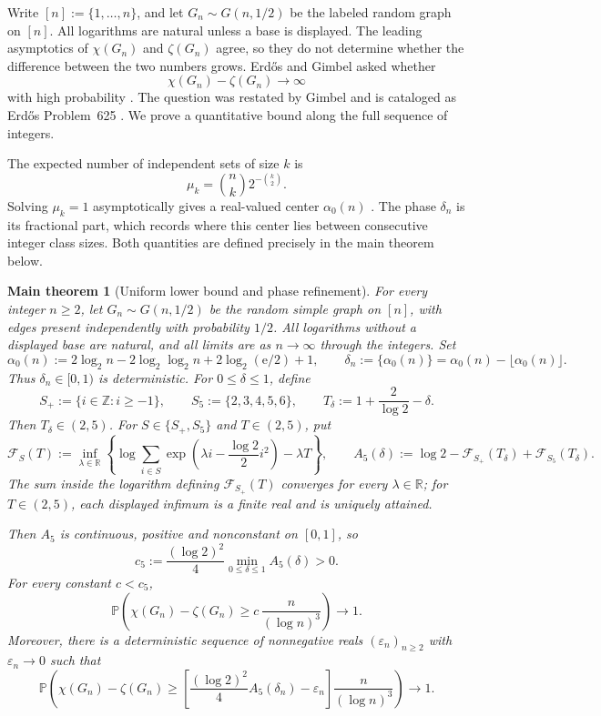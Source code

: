 \documentclass[a4paper,10pt,reqno]{amsart}
\numberwithin{equation}{section}
\theoremstyle{plain}
\newtheorem*{maintheorem}{Main theorem}
\theoremstyle{remark}
\begin{document}
Write $[n]:=\{1,\ldots,n\}$, and let $G_n\sim G(n,1/2)$ be the labeled random
graph on $[n]$. All logarithms are natural unless a base is displayed.
The leading asymptotics of $\chi(G_n)$ and $\zeta(G_n)$ agree, so they do
not determine whether the difference between the two numbers grows. Erd\H{o}s
and Gimbel asked whether
\[
  \chi(G_n)-\zeta(G_n)\longrightarrow\infty
\]
with high probability \citep[p.~263]{erdos-gimbel-1993}. The question was
restated by Gimbel \citep[Section~7.4]{gimbel-2016} and is cataloged as
Erd\H{o}s Problem~625 \citep{bloom-erdos625}. We prove a quantitative bound
along the full sequence of integers.

The expected number of independent sets of size $k$ is
\[
  \mu_k=\binom nk2^{-\binom k2}.
\]
Solving $\mu_k=1$ asymptotically gives a real-valued center
$\alpha_0(n)$ \citep[p.~420]{bollobas-erdos-1976}. The phase
$\delta_n$ is its fractional part, which records where this center lies
between consecutive integer class sizes. Both quantities are defined
precisely in the main theorem below.

\begin{maintheorem}[Uniform lower bound and phase refinement]
For every integer \(n\ge2\), let \(G_n\sim G(n,1/2)\) be the random simple
graph on \([n]\), with edges present independently with probability \(1/2\).
All logarithms without a displayed base are natural, and all limits are
as \(n\to\infty\) through the integers. Set
\[
  \alpha_0(n):=
  2\log_2 n-2\log_2\log_2 n+2\log_2(\mathrm e/2)+1,
  \qquad
  \delta_n:=\{\alpha_0(n)\}
  =\alpha_0(n)-\lfloor\alpha_0(n)\rfloor.
\]
Thus $\delta_n\in[0,1)$ is deterministic.  For $0\le\delta\le1$, define
\[
  S_+:=\{i\in\mathbb Z:i\ge-1\},\qquad
  S_5:=\{2,3,4,5,6\},\qquad
  T_\delta:=1+\frac{2}{\log 2}-\delta.
\]
Then $T_\delta\in(2,5)$.  For $S\in\{S_+,S_5\}$ and $T\in(2,5)$, put
\[
  \mathcal F_S(T):=
  \inf_{\lambda\in\mathbb R}
  \left\{
    \log\!\sum_{i\in S}
      \exp\!\left(\lambda i-\frac{\log 2}{2}i^2\right)
    -\lambda T
  \right\},
  \qquad
  A_5(\delta):=
  \log 2-\mathcal F_{S_+}(T_\delta)+\mathcal F_{S_5}(T_\delta).
\]
The sum inside the logarithm defining $\mathcal F_{S_+}(T)$ converges for every
$\lambda\in\mathbb R$; for $T\in(2,5)$, each displayed infimum is a finite real
and is uniquely attained.

Then $A_5$ is continuous, positive and nonconstant on $[0,1]$, so
\[
  c_5:=\frac{(\log 2)^2}{4}\min_{0\le\delta\le1}A_5(\delta)>0.
\]
For every constant \(c<c_5\),
\[
  \mathbb P\!\left(
    \chi(G_n)-\zeta(G_n)
    \ge
    c\,\frac{n}{(\log n)^3}
  \right)
  \longrightarrow 1.
\]
Moreover, there is a deterministic sequence of nonnegative reals
$(\varepsilon_n)_{n\ge2}$ with $\varepsilon_n\to0$ such that
\[
  \mathbb P\!\left(
    \chi(G_n)-\zeta(G_n)
    \ge
    \left[
      \frac{(\log 2)^2}{4}A_5(\delta_n)-\varepsilon_n
    \right]
    \frac{n}{(\log n)^3}
  \right)
  \longrightarrow1.
\]
\end{maintheorem}
\end{document}
